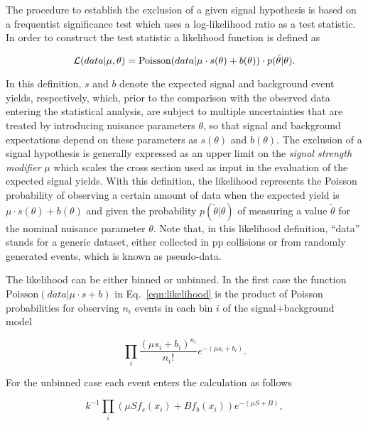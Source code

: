 The procedure to establish the exclusion of a given signal hypothesis is based on a frequentist significance test which uses a log-likelihood ratio as a test statistic.
In order to construct the test statistic a likelihood function is defined as

\begin{equation}\label{eqn:likelihood}
{\cal L}( data | \mu,\theta) = \mathrm{Poisson}(data | \mu\cdot s(\theta) + b(\theta))\cdot p(\tilde{\theta}|\theta).
\end{equation}

In this definition, $s$ and $b$ denote the expected signal and background event yields, respectively,
which, prior to the comparison with the observed data entering the statistical analysis, are subject to multiple uncertainties that are treated by introducing nuisance parameters $\theta$,
so that signal and background expectations depend on these parameters as $s(\theta)$ and $b(\theta)$.
The exclusion of a signal hypothesis is generally expressed as an upper limit on the \textit{signal strength modifier} $\mu$
which scales the cross section used as input in the evaluation of the expected signal yields.
With this definition, the likelihood represents the Poisson probability of observing a certain amount of data when the expected yield is $\mu\cdot s(\theta) + b(\theta)$
and given the probability $p(\tilde{\theta}|\theta)$ of measuring a value $\tilde{\theta}$ for the nominal nuisance parameter $\theta$.
Note that, in this likelihood definition, ``data'' stands for a generic dataset, either
collected in pp collisions or from randomly generated events, which is known as pseudo-data.

The likelihood can be either binned or unbinned. In the first case the function $\mathrm{Poisson}(data | \mu\cdot s + b)$ in Eq.~\ref{eqn:likelihood} is the product of Poisson probabilities
for observing $n_i$ events in each bin $i$ of the signal+background model

\begin{equation}\label{eqn:binned}
\prod_i \frac{(\mu s_{i} +b_{i})^{n_i}}{n_i!}e^{-(\mu s_i + b_i)}.
\end{equation}

For the unbinned case each event enters the calculation as follows

\begin{equation}\label{eqn:unbinned}
k^{-1}\prod_i (\mu S f_s(x_i) + Bf_b(x_i))e^{-(\mu S + B)},
\end{equation}

